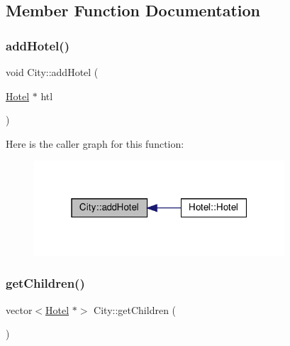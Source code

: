 \subsection{Member Function Documentation}
\mbox{\label{class_city_af0fcf2e1e6da71f2b72444d9984d7163}} 
\subsubsection{\texorpdfstring{add\+Hotel()}{addHotel()}}
{\footnotesize\ttfamily void City\+::add\+Hotel (\begin{DoxyParamCaption}\item[{\hyperlink{class_hotel}{Hotel} $\ast$}]{htl }\end{DoxyParamCaption})\hspace{0.3cm}{\ttfamily [inline]}}

Here is the caller graph for this function\+:\nopagebreak
\begin{figure}[H]
\begin{center}
\leavevmode
\includegraphics[width=265pt]{class_city_af0fcf2e1e6da71f2b72444d9984d7163_icgraph}
\end{center}
\end{figure}
\mbox{\label{class_city_adf8a1f3a0a67ecc07eb4eff1ee3c4e9b}} 
\subsubsection{\texorpdfstring{get\+Children()}{getChildren()}}
{\footnotesize\ttfamily vector$<$\hyperlink{class_hotel}{Hotel} $\ast$$>$ City\+::get\+Children (\begin{DoxyParamCaption}{ }\end{DoxyParamCaption})\hspace{0.3cm}{\ttfamily [inline]}}

\mbox{\label{class_city_a1215390b5e3b11dc19abeedcb096b720}} 
